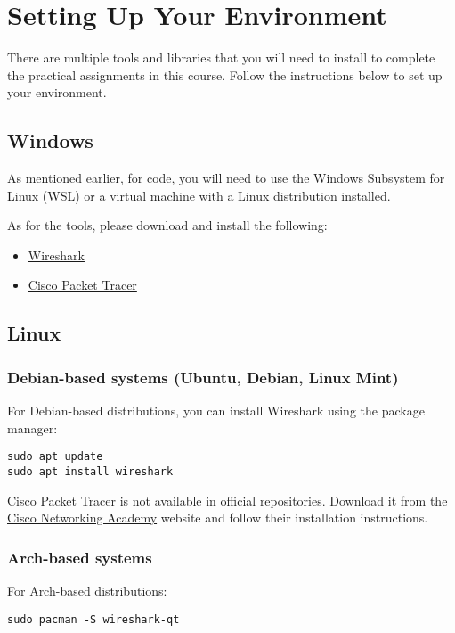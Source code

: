 \section{Setting Up Your Environment}

There are multiple tools and libraries that you will need to install to complete the practical assignments in this course. Follow the instructions below to set up your environment.

\subsection{Windows}
As mentioned earlier, for code, you will need to use the Windows Subsystem for Linux (WSL) or a virtual machine with a Linux distribution installed.

As for the tools, please download and install the following:
\begin{itemize}
    \item \href{https://www.wireshark.org/download.html}{Wireshark}
    \item \href{https://www.netacad.com/cisco-packet-tracer}{Cisco Packet Tracer}
\end{itemize}

\subsection{Linux}

\subsubsection{Debian-based systems (Ubuntu, Debian, Linux Mint)}
For Debian-based distributions, you can install Wireshark using the package manager:
\begin{verbatim}
sudo apt update
sudo apt install wireshark
\end{verbatim}

\begin{noteblock}
Cisco Packet Tracer is not available in official repositories. Download it from the \href{https://www.netacad.com/courses/packet-tracer}{Cisco Networking Academy} website and follow their installation instructions.
\end{noteblock}

\subsubsection{Arch-based systems}
For Arch-based distributions:
\begin{verbatim}
sudo pacman -S wireshark-qt
\end{verbatim}

